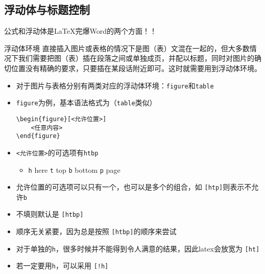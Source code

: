 \subsection{浮动体与标题控制}
\begin{frame}
	\centering
	\Huge 公式和浮动体是\LaTeX 完爆Word的两个方面！！
\end{frame}
\begin{frame}[fragile]{浮动体环境}
	直接插入图片或表格的情况下是图（表）文混在一起的，但大多数情况下我们需要把图（表）插在段落之间或单独成页，并配以标题，同时对图片的确切位置没有精确的要求，只要插在某段话附近即可。这时就需要用到浮动体环境。
	\begin{itemize}
		\item 对于图片与表格分别有两类对应的浮动体环境：\texttt{figure}和\texttt{table}
		\item \texttt{figure}为例，基本语法格式为（\texttt{table}类似）
\begin{lstlisting}
\begin{figure}[<允许位置>]
    <任意内容>
\end{figure}
\end{lstlisting}
		\item \verb|<允许位置>|的可选项有\texttt{htbp}
		\begin{itemize}
			\item \quad \texttt{h} here \qquad \texttt{t} \quad top \qquad \texttt{b} \quad bottom \qquad \texttt{p} \quad page
		\end{itemize}
	\end{itemize}
\end{frame}
\begin{frame}[fragile]
	\begin{itemize}
		\item 允许位置的可选项可以只有一个，也可以是多个的组合，如 \verb|[htp]|则表示不允许\texttt{b}
		\item 不填则默认是 \verb|[htbp]|
		\item 顺序无关紧要，因为总是按照 \verb|[htbp]|的顺序来尝试
		\item 对于单独的\texttt{h}，很多时候并不能得到令人满意的结果，因此latex会放宽为 \verb|[ht]|
		\item 若一定要用\texttt{h}，可以采用 \verb|[!h]|
	\end{itemize}
\end{frame}
